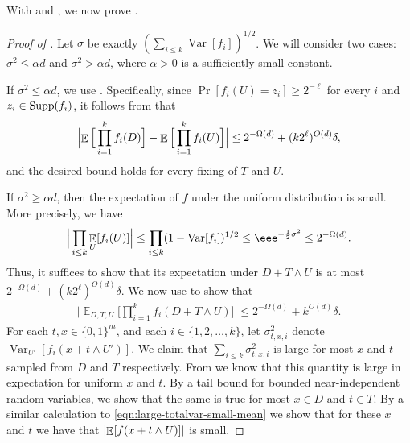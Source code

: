 \documentclass{toc}
\newcommand{\zo}{\{0,1\}}
\def\Blocklength{\ell}
\def\Supp{\textnormal{Supp}}
\DeclarePairedDelimiter{\abs}{\lvert}{\rvert}
\DeclareMathOperator*{\E}{\mathbb{E}}                 %
\DeclareMathOperator*{\Var}{Var}                 %
\begin{document}
  With  and , we now prove .

\begin{proof}[Proof of {}]
    Let $\sigma$ be exactly $(\sum_{i \le k} \Var[f_i])^{1/2}$.
    We will consider two cases:  $\sigma^2 \le \alpha d$ and $\sigma^2 > \alpha d$, where $\alpha > 0$ is a sufficiently small constant.

    If $\sigma^2 \le \alpha d$, we use .
    Specifically, since $\Pr[f_i(U) = z_i] \ge 2^{-\Blocklength}$ for every $i$ and $z_i \in \Supp(f_i)$, it follows from  that
    \[
      \Bigl| \E \Big[ \prod_{i=1}^k f_i(D) \Big] - \E \Big[ \prod_{i=1}^k f_i(U) \Big] \Bigr|
      \le 2^{-\Omega(d)} + (k 2^\Blocklength)^{O(d)} \delta ,
    \]
    and the desired bound holds for every fixing of $T$ and $U$.

    \medskip

    If $\sigma^2 \ge \alpha d$, then the expectation of $f$ under the uniform distribution is small.
		More precisely, we have
		\begin{align} \label{eqn:large-totalvar-small-mean}
      \Big| \prod_{i \le k} \E_{U}[f_i(U)] \Big|
      \le \prod_{i \le k} (1 - \Var[f_i])^{1/2} 
      \le \eee^{-\frac{1}{2} \sigma^2} 
      \le 2^{-\Omega(d)} .
		\end{align}
    Thus, it suffices to show that its expectation under $D + T \wedge U$ is at most $2^{-\Omega(d)} + (k 2^\Blocklength)^{O(d)} \delta$.
		We now use  to show that
    \begin{align*}
      \Big| \E_{D,T,U} \Big[ \prod_{i=1}^k f_i(D + T \wedge U) \Big] \Big|
      \le 2^{-\Omega(d)} + k^{O(d)} \delta . 
    \end{align*}
    For each $t, x \in \zo^m$, and each $i \in \{1, 2, \ldots, k\}$, let $\sigma_{t, x, i}^2$ denote $\Var_{U'} [f_i(x + t \wedge U')]$.
		We claim that $\sum_{i \le k} \sigma_{t,x,i}^2$ is large for most $x$ and $t$ sampled from $D$ and $T$ respectively.  {}From  we know that this quantity is large in expectation for uniform $x$ and $t$.
    By a tail bound for bounded near-independent random variables, we show that the same is true for most $x \in D$ and $t \in T$.
		By a similar calculation to \eqref{eqn:large-totalvar-small-mean} we show that for these $x$ and $t$ we have that $\abs{\E[f(x + t \wedge U)]}$ is small.


\end{proof}
\end{document}
